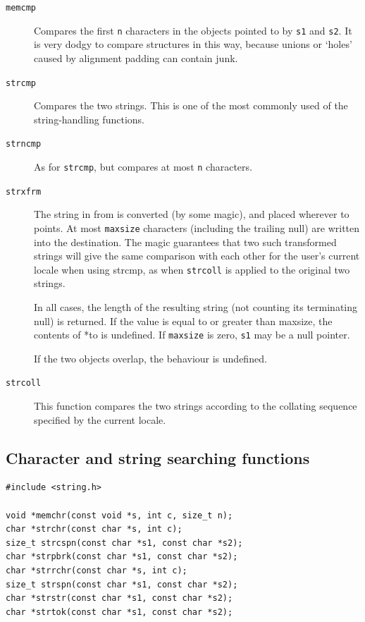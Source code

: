    \begin{description}
   \item[\texttt{memcmp}]
     Compares the first \texttt{n} characters in the objects pointed to
     by  \texttt{s1} and \texttt{s2}.  It is very dodgy to compare
     structures in this way, because unions or `holes' caused  by
     alignment padding can contain junk.

   \item[\texttt{strcmp}]
     Compares the two  strings.   This  is  one  of  the  most commonly used
     of the string-handling functions.

   \item[\texttt{strncmp}]
     As for \texttt{strcmp}, but compares at most \texttt{n}
     characters.

    \item[\texttt{strxfrm}] 
     The string in from is  converted  (by  some  magic),  and placed
      wherever  to  points.  At most \texttt{maxsize} characters (including
      the  trailing  null)  are  written  into  the destination.
      The   magic guarantees  that  two  such transformed strings
      will give the  same comparison with each other
      for the  user's  current  locale when using strcmp,
      as when \texttt{strcoll} is applied to  the  original two strings.


     In all cases, the length of  the  resulting  string  (not counting its
      terminating null) is returned.  If the value is equal to or greater than
      maxsize, the contents of  *to is  undefined.
      If  \texttt{maxsize} is zero, \texttt{s1} may be a null pointer.


     If the two objects overlap, the behaviour is undefined.

   \item[\texttt{strcoll}]
     This function compares the two strings according  to  the
     collating sequence specified by the current locale.
   \end{description}

  

  \subsection{Character and string searching functions}
   

   \begin{Verbatim}
#include <string.h>

void *memchr(const void *s, int c, size_t n);
char *strchr(const char *s, int c);
size_t strcspn(const char *s1, const char *s2);
char *strpbrk(const char *s1, const char *s2);
char *strrchr(const char *s, int c);
size_t strspn(const char *s1, const char *s2);
char *strstr(const char *s1, const char *s2);
char *strtok(const char *s1, const char *s2);
\end{Verbatim}


